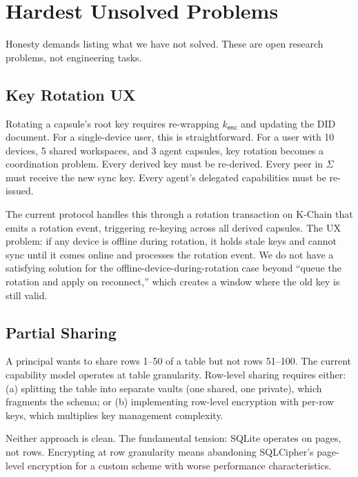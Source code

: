 \documentclass[11pt,a4paper]{article}
\begin{document}
\section{Hardest Unsolved Problems}\label{sec:unsolved}

Honesty demands listing what we have not solved. These are open research
problems, not engineering tasks.

\subsection{Key Rotation UX}

Rotating a capsule's root key requires re-wrapping $k_{\mathsf{enc}}$ and
updating the DID document. For a single-device user, this is straightforward.
For a user with 10 devices, 5 shared workspaces, and 3 agent capsules, key
rotation becomes a coordination problem. Every derived key must be re-derived.
Every peer in $\Sigma$ must receive the new sync key. Every agent's delegated
capabilities must be re-issued.

The current protocol handles this through a rotation transaction on K-Chain that
emits a rotation event, triggering re-keying across all derived capsules. The
UX problem: if any device is offline during rotation, it holds stale keys
and cannot sync until it comes online and processes the rotation event. We do
not have a satisfying solution for the offline-device-during-rotation case
beyond ``queue the rotation and apply on reconnect,'' which creates a window
where the old key is still valid.

\subsection{Partial Sharing}

A principal wants to share rows 1--50 of a table but not rows 51--100. The
current capability model operates at table granularity. Row-level sharing
requires either: (a) splitting the table into separate vaults (one shared,
one private), which fragments the schema; or (b) implementing row-level
encryption with per-row keys, which multiplies key management complexity.

Neither approach is clean. The fundamental tension: SQLite operates on pages,
not rows. Encrypting at row granularity means abandoning SQLCipher's
page-level encryption for a custom scheme with worse performance
characteristics.
\end{document}
